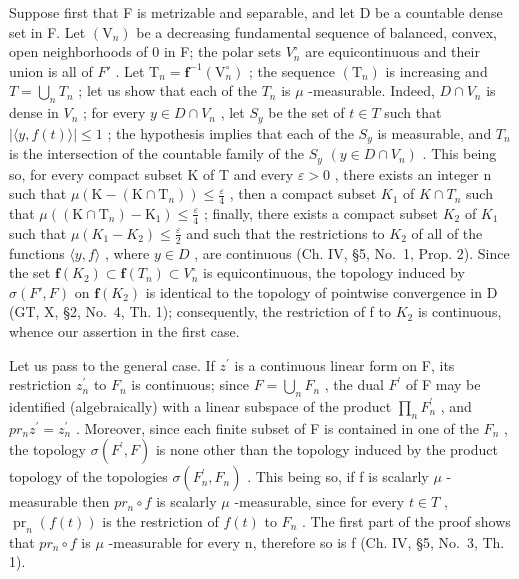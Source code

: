 Suppose first that F is metrizable and separable, and let D be a countable dense set in F. Let \((\mathrm{V}_{n})\) be a decreasing fundamental sequence of balanced, convex, open neighborhoods of 0 in F; the polar sets \(V_{n}^{\circ}\) are equicontinuous and their union is all of \(F'\) . Let \(\mathrm{T}_{n} = \mathbf{f}^{-1}(\mathrm{V}_{n}^{\circ})\) ; the sequence \((\mathrm{T}_{n})\) is increasing and \(T = \bigcup_{n} T_{n}\) ; let us show that each of the \(T_{n}\) is \(\mu\) -measurable. Indeed, \(D \cap V_{n}\) is dense in \(V_{n}\) ; for every \(y \in D \cap V_{n}\) , let \(S_{y}\) be the set of \(t \in T\) such that \(|\langle y, f(t) \rangle| \leqslant 1\) ; the hypothesis implies that each of the \(S_{y}\) is measurable, and \(T_{n}\) is the intersection of the countable family of the \(S_{y}\) \((y \in D \cap V_{n})\) . This being so, for every compact subset K of T and every \(\varepsilon > 0\) , there exists an integer n such that \(\mu\left(\mathrm{K}-\left(\mathrm{K}\cap\mathrm{T}_{n}\right)\right)\leqslant\frac{\varepsilon}{4}\) , then a compact subset \(K_{1}\) of \(K\cap T_{n}\) such that \(\mu\left(\left(\mathrm{K}\cap\mathrm{T}_{n}\right)-\mathrm{K}_{1}\right)\leqslant\frac{\varepsilon}{4}\) ; finally, there exists a compact subset \(K_{2}\) of \(K_{1}\) such that \(\mu(K_{1}-K_{2})\leqslant\frac{\varepsilon}{2}\) and such that the restrictions to \(K_{2}\) of all of the functions \(\langle y,f\rangle\) , where \(y\in D\) , are continuous (Ch. IV, §5, No.~1, Prop. 2). Since the set \(\mathbf{f}(K_{2})\subset\mathbf{f}(T_{n})\subset V_{n}^{\circ}\) is equicontinuous, the topology induced by \(\sigma(F',F)\) on \(\mathbf{f}(K_{2})\) is identical to the topology of pointwise convergence in D (GT, X, §2, No.~4, Th. 1); consequently, the restriction of f to \(K_{2}\) is continuous, whence our assertion in the first case.

Let us pass to the general case. If \(z^{\prime}\) is a continuous linear form on F, its restriction \(z_{n}^{\prime}\) to \(F_{n}\) is continuous; since \(F = \bigcup_{n} F_{n}\) , the dual \(F^{\prime}\) of F may be identified (algebraically) with a linear subspace of the product \(\prod_{n} F_{n}^{\prime}\) , and \(pr_{n}z^{\prime} = z_{n}^{\prime}\) . Moreover, since each finite subset of F is contained in one of the \(F_{n}\) , the topology \(\sigma(F^{\prime}, F)\) is none other than the topology induced by the product topology of the topologies \(\sigma(F_{n}^{\prime}, F_{n})\) . This being so, if f is scalarly \(\mu\) -measurable then \(pr_{n} \circ f\) is scalarly \(\mu\) -measurable, since for every \(t \in T\) , \(\operatorname{pr}_{n}(f(t))\) is the restriction of \(f(t)\) to \(F_{n}\) . The first part of the proof shows that \(pr_{n} \circ f\) is \(\mu\) -measurable for every n, therefore so is f (Ch. IV, §5, No.~3, Th. 1).

